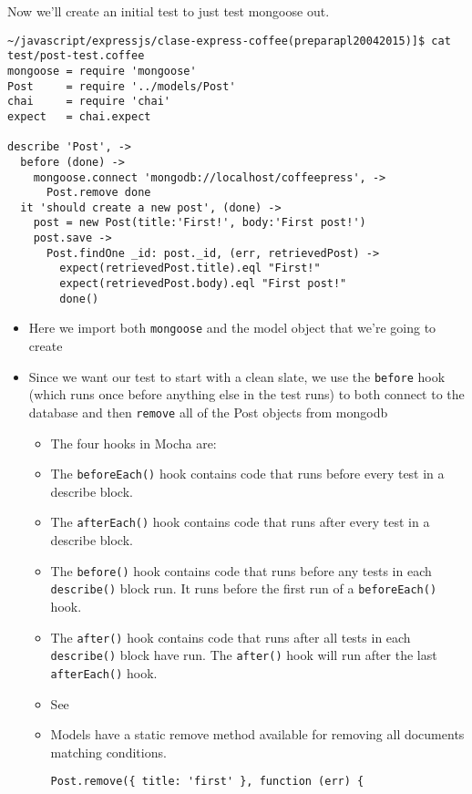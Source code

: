 Now we’ll create an initial test to just test mongoose out.
\begin{verbatim}
~/javascript/expressjs/clase-express-coffee(preparapl20042015)]$ cat test/post-test.coffee 
mongoose = require 'mongoose'
Post     = require '../models/Post'
chai     = require 'chai'
expect   = chai.expect

describe 'Post', ->
  before (done) ->
    mongoose.connect 'mongodb://localhost/coffeepress', ->
      Post.remove done
  it 'should create a new post', (done) ->
    post = new Post(title:'First!', body:'First post!')
    post.save ->
      Post.findOne _id: post._id, (err, retrievedPost) ->
        expect(retrievedPost.title).eql "First!"
        expect(retrievedPost.body).eql "First post!"
        done()
\end{verbatim}
\begin{itemize}
\item
Here we import both \verb|mongoose| and the model object that we’re going
to create
\item
Since we want our test to start with a clean slate, we use
the \verb|before| hook (which runs once before anything else in the test runs)
to both connect to the database and then \verb|remove| all of the Post objects
from mongodb
\begin{itemize}
\item
The four hooks in Mocha are:
\item
The \verb|beforeEach()| hook contains code that runs before every test in a describe block.
\item
The \verb|afterEach()| hook contains code that runs after every test in a describe block.
\item
The \verb|before()| hook contains code that runs before any tests in each \verb|describe()| block run. It runs before the first run of a \verb|beforeEach()| hook.
\item
The \verb|after()| hook contains code that runs after all tests in each \verb|describe()| block have run. The \verb|after()| hook will run after the last \verb|afterEach()| hook.
\item
See
\end{itemize}
\begin{itemize}
\item
Models have a static remove method available for removing all documents matching conditions.
\begin{verbatim}
Post.remove({ title: 'first' }, function (err) {

\end{verbatim}
\end{itemize}
\end{itemize}
